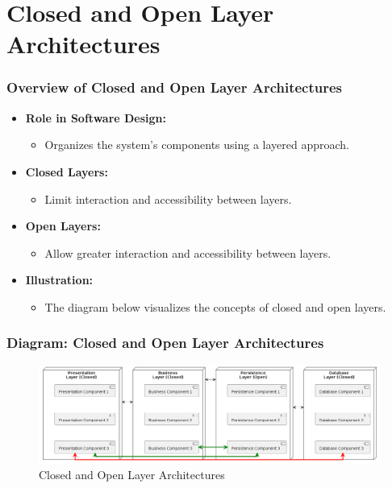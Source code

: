 \documentclass[aspectratio=169, table]{beamer}
\begin{document}
\section{Closed and Open Layer Architectures}

\begin{frame}
	\frametitle{Overview of Closed and Open Layer Architectures}
	\begin{itemize}
		\item \textbf{Role in Software Design:}
		\begin{itemize}
			\item Organizes the system's components using a layered approach.
		\end{itemize}
		\item \textbf{Closed Layers:}
		\begin{itemize}
			\item Limit interaction and accessibility between layers.
		\end{itemize}
		\item \textbf{Open Layers:}
		\begin{itemize}
			\item Allow greater interaction and accessibility between layers.
		\end{itemize}
		\item \textbf{Illustration:}
		\begin{itemize}
			\item The diagram below visualizes the concepts of closed and open layers.
		\end{itemize}
	\end{itemize}
\end{frame}

\begin{frame}
	\frametitle{Diagram: Closed and Open Layer Architectures}
	\begin{figure}[ht]
		\centering
		\includegraphics[width=\textwidth]{../../images/out/layered_architecture_open.png}
		\caption{Closed and Open Layer Architectures}
	\end{figure}
\end{frame}
\end{document}
